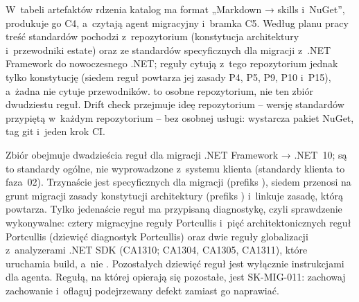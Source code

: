 W~tabeli artefaktów rdzenia katalog  ma format „Markdown → skills
i~NuGet”, produkuje go C4, a~czytają agent migracyjny i~bramka C5. Według planu pracy
treść standardów pochodzi z~repozytorium  (konstytucja
architektury i~przewodniki estate) oraz ze standardów specyficznych dla migracji z~.NET
Framework do nowoczesnego .NET; reguły cytują z~tego repozytorium jednak tylko konstytucję
(siedem reguł  powtarza jej zasady P4, P5, P9, P10 i~P15), a~żadna nie
cytuje przewodników.  to osobne repozytorium, nie ten zbiór
dwudziestu reguł.
Drift check przejmuje ideę repozytorium  -- wersję standardów
przypiętą w~każdym repozytorium -- bez osobnej usługi: wystarcza pakiet NuGet, tag git
i~jeden krok CI.

Zbiór obejmuje dwadzieścia reguł dla migracji .NET Framework → .NET~10; są to standardy
ogólne, nie wyprowadzone z~systemu klienta (standardy klienta to faza~02). Trzynaście jest
specyficznych dla migracji (prefiks ), siedem przenosi na grunt migracji
zasady konstytucji architektury (prefiks ) i~linkuje zasadę, którą
powtarza. Tylko jedenaście reguł ma przypisaną diagnostykę, czyli sprawdzenie wykonywalne:
cztery migracyjne reguły Portcullis i~pięć architektonicznych reguł Portcullis (dziewięć
diagnostyk Portcullis) oraz dwie reguły globalizacji z~analyzerami .NET SDK (CA1310;
CA1304, CA1305, CA1311), które uruchamia build, a~nie . Pozostałych
dziewięć reguł jest wyłącznie instrukcjami dla agenta. Regułą, na której opierają się
pozostałe, jest SK-MIG-011: zachowaj zachowanie i~oflaguj podejrzewany defekt zamiast go
naprawiać.

